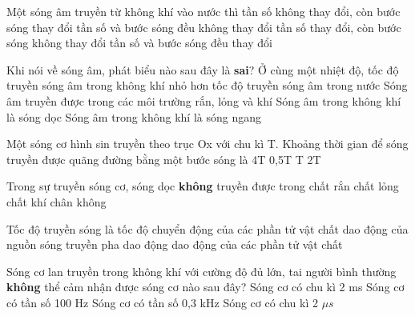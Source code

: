  \begin{ex}%
Một sóng âm truyền từ không khí vào nước thì
\choice
{\True tần số không thay đổi, còn bước sóng thay đổi}
{tần số và bước sóng đều không thay đổi}
{tần số thay đổi, còn bước sóng không thay đổi}
{tần số và bước sóng đều thay đổi}
\end{ex} 
\begin{ex}%
Khi nói về sóng âm, phát biểu nào sau đây là \textbf{sai}?
\choice
{Ở cùng một nhiệt độ, tốc độ truyền sóng âm trong không khí nhỏ hơn tốc độ truyền sóng âm trong nước}
{Sóng âm truyền được trong các môi trường rắn, lỏng và khí}
{Sóng âm trong không khí là sóng dọc}
{\True Sóng âm trong không khí là sóng ngang}
\end{ex} 
\begin{ex}%
 Một sóng cơ hình sin truyền theo trục Ox với chu kì T. Khoảng thời gian để sóng truyền được quãng đường bằng một bước sóng là
\choice
{4T}
{0,5T}
{\True T}
{2T}
\end{ex} 
\begin{ex}%
 Trong sự truyền sóng cơ, sóng dọc \textbf{không} truyền được trong
\choice
{chất rắn}
{chất lỏng}
{chất khí}
{\True chân không}
\end{ex} 
\begin{ex}%
Tốc độ truyền sóng là tốc độ
\choice
{chuyển động của các phần tử vật chất}
{dao động của nguồn sóng}
{\True truyền pha dao động}
{dao động của các phần tử vật chất}
\end{ex} 
\begin{ex}%
Sóng cơ lan truyền trong không khí với cường độ đủ lớn, tai người bình thường \textbf{không} thể cảm nhận được sóng cơ nào sau đây?
\choice
{Sóng cơ có chu kì 2 ms}
{Sóng cơ có tần số 100 Hz}
{Sóng cơ có tần số 0,3 kHz}
{\True Sóng cơ có chu kì 2 $\mu s$}
\end{ex} 
